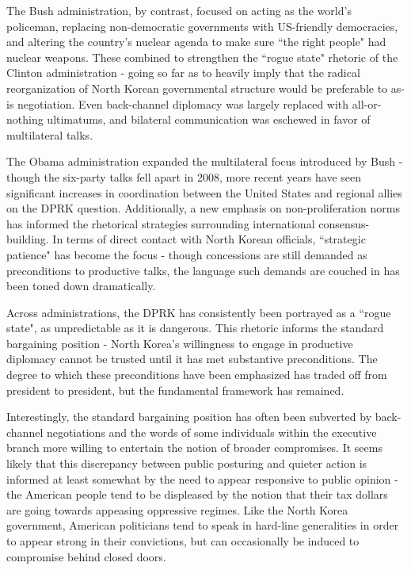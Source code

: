 The Bush administration, by contrast, focused on acting as the world's policeman, replacing non-democratic governments with US-friendly democracies, and altering the country's nuclear agenda to make sure ``the right people" had nuclear weapons. These combined to strengthen the ``rogue state" rhetoric of the Clinton administration - going so far as to heavily imply that the radical reorganization of North Korean governmental structure would be preferable to as-is negotiation. Even back-channel diplomacy was largely replaced with all-or-nothing ultimatums, and bilateral communication was eschewed in favor of multilateral talks.

The Obama administration expanded the multilateral focus introduced by Bush - though the six-party talks fell apart in 2008, more recent years have seen significant increases in coordination between the United States and regional allies on the DPRK question. Additionally, a new emphasis on non-proliferation norms has informed the rhetorical strategies surrounding international consensus-building. In terms of direct contact with North Korean officials, ``strategic patience" has become the focus - though concessions are still demanded as preconditions to productive talks, the language such demands are couched in has been toned down dramatically.

Across administrations, the DPRK has consistently been portrayed as a ``rogue state", as unpredictable as it is dangerous. This rhetoric informs the standard bargaining position - North Korea's willingness to engage in productive diplomacy cannot be trusted until it has met substantive preconditions. The degree to which these preconditions have been emphasized has traded off from president to president, but the fundamental framework has remained. 

Interestingly, the standard bargaining position has often been subverted by back-channel negotiations and the words of some individuals within the executive branch more willing to entertain the notion of broader compromises. It seems likely that this discrepancy between public posturing and quieter action is informed at least somewhat by the need to appear responsive to public opinion - the American people tend to be displeased by the notion that their tax dollars are going towards appeasing oppressive regimes. Like the North Korea government, American politicians tend to speak in hard-line generalities in order to appear strong in their convictions, but can occasionally be induced to compromise behind closed doors.
